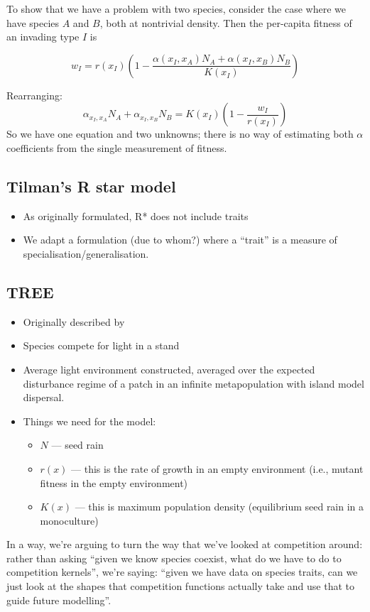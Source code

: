 \documentclass[a4paper,11pt]{article}
\begin{document}
To show that we have a problem with two species, consider the case
where we have species $A$ and $B$, both at nontrivial density.  Then
the per-capita fitness of an invading type $I$ is

\begin{equation*}
  w_I = r(x_I)\left(1 - \frac{\alpha(x_I, x_A) N_A + \alpha(x_I, x_B) N_B}{K(x_I)}\right)
\end{equation*}

Rearranging:
\begin{equation*}
  \alpha_{x_I, x_A} N_A + \alpha_{x_I, x_B} N_B =
  K(x_I)\left(1 - \frac{w_I}{r(x_I)}\right)
\end{equation*}
So we have one equation and two unknowns; there is no way of
estimating both $\alpha$ coefficients from the single measurement of
fitness.

\subsection{Tilman's R star model}
\begin{itemize}
\item As originally formulated, R* does not include traits
\item We adapt a formulation (due to whom?) where a ``trait'' is a
  measure of specialisation/generalisation.
\end{itemize}

\subsection{TREE}
\begin{itemize}
\item Originally described by \citet{Falster-2011}
\item Species compete for light in a stand
\item Average light environment constructed, averaged over the
  expected disturbance regime of a patch in an infinite metapopulation
  with island model dispersal.
\item Things we need for the model:
  \begin{itemize}
  \item $N$ --- seed rain
  \item $r(x)$ --- this is the rate of growth in an empty environment
    (i.e., mutant fitness in the empty environment)
  \item $K(x)$ --- this is maximum population density (equilibrium
    seed rain in a monoculture)
  \end{itemize}
\end{itemize}

In a way, we're arguing to turn the way that we've looked at
competition around: rather than asking ``given we know species
coexist, what do we have to do to competition kernels'', we're
saying: ``given we have data on species traits, can we just look at
the shapes that competition functions actually take and use that to
guide future modelling''.



\end{document}
